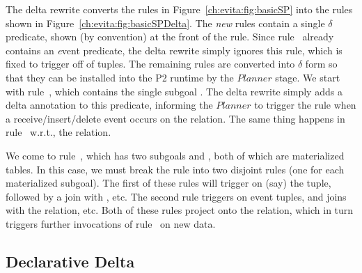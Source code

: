 The delta rewrite converts the rules in Figure~\ref{ch:evita:fig:basicSP} into
the rules shown in Figure~\ref{ch:evita:fig:basicSPDelta}.  The {\em new} rules
contain a single $\delta$ predicate, shown (by convention) at the front of the
rule.  Since rule~ already contains an {\emph event} predicate, the
delta rewrite simply ignores this rule, which is fixed to trigger off of
 tuples.  The remaining rules are converted into $\delta$ form
so that they can be installed into the P2 runtime by the $Planner$ stage.  We
start with rule~, which contains the single subgoal .  The
delta rewrite simply adds a delta annotation to this predicate, informing the
$Planner$ to trigger the rule when a receive/insert/delete event occurs on the
 relation.  The same thing happens in rule~ w.r.t., the
 relation.

We come to rule~, which has two subgoals  and , both
of which are materialized tables.  In this case, we must break the rule into
two disjoint rules (one for each materialized subgoal).  The first of these
rules will trigger on (say) the  tuple, followed by a join with
, etc.  The second rule triggers on  event tuples, and joins
with the  relation, etc.  Both of these rules project onto the
 relation, which in turn triggers further invocations of rule~
on new  data.

\subsection{Declarative Delta}

